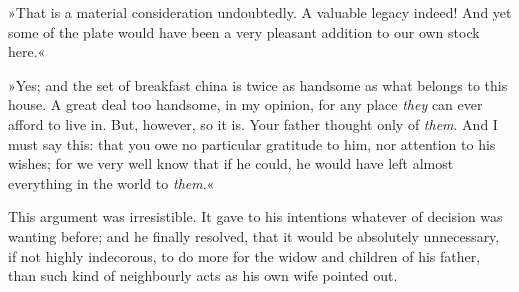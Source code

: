 »That is a material consideration undoubtedly. A valuable legacy indeed! And yet some of the plate would have been a very pleasant addition to our own stock here.«

»Yes; and the set of breakfast china is twice as handsome as what belongs to this house. A great deal too handsome, in my opinion, for any place \textit{they} can ever afford to live in. But, however, so it is. Your father thought only of \textit{them}. And I must say this: that you owe no particular gratitude to him, nor attention to his wishes; for we very well know that if he could, he would have left almost everything in the world to \textit{them}.«

This argument was irresistible. It gave to his intentions whatever of decision was wanting before; and he finally resolved, that it would be absolutely unnecessary, if not highly indecorous, to do more for the widow and children of his father, than such kind of neighbourly acts as his own wife pointed out.
